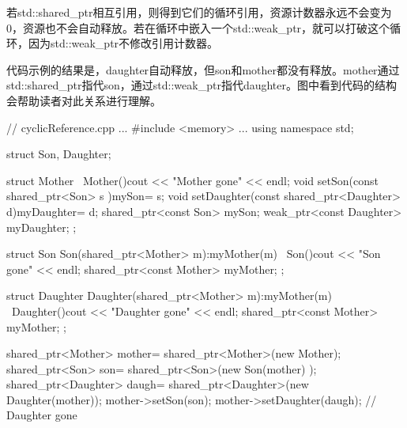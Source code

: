 若std::shared\_ptr相互引用，则得到它们的循环引用，资源计数器永远不会变为0，资源也不会自动释放。若在循环中嵌入一个std::weak\_ptr，就可以打破这个循环，因为std::weak\_ptr不修改引用计数器。

代码示例的结果是，daughter自动释放，但son和mother都没有释放。mother通过std::shared\_ptr指代son，通过std::weak\_ptr指代daughter。图中看到代码的结构会帮助读者对此关系进行理解。



\begin{cpp}
// cyclicReference.cpp
...
#include <memory>
...
using namespace std;

struct Son, Daughter;

struct Mother{
	~Mother(){cout << "Mother gone" << endl;}
	void setSon(const shared_ptr<Son> s ){mySon= s;}
	void setDaughter(const shared_ptr<Daughter> d){myDaughter= d;}
	shared_ptr<const Son> mySon;
	weak_ptr<const Daughter> myDaughter;
};

struct Son{
	Son(shared_ptr<Mother> m):myMother(m){}
	~Son(){cout << "Son gone" << endl;}
	shared_ptr<const Mother> myMother;
};

struct Daughter{
	Daughter(shared_ptr<Mother> m):myMother(m){}
	~Daughter(){cout << "Daughter gone" << endl;}
	shared_ptr<const Mother> myMother;
};

{
	shared_ptr<Mother> mother= shared_ptr<Mother>(new Mother);
	shared_ptr<Son> son= shared_ptr<Son>(new Son(mother) );
	shared_ptr<Daughter> daugh= shared_ptr<Daughter>(new Daughter(mother));
	mother->setSon(son);
	mother->setDaughter(daugh);
}
// Daughter gone
\end{cpp}


